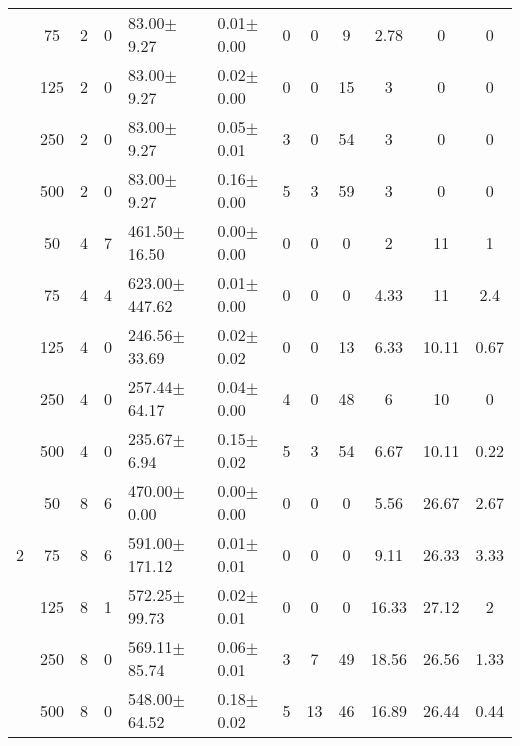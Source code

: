 \documentclass[article]{llncs}
\begin{document}
\begin{table}[h]
\begin{center}
\begin{tabular}{c c c c l l c c c c c c}
 &75      &  2   &    0  &  83.00$\pm$9.27      &        0.01$\pm$0.00  &  0  &          0   &            9   &         2.78    &       0       &  0       \\
 &125     &  2   &    0  &  83.00$\pm$9.27      &        0.02$\pm$0.00  &  0  &          0   &            15  &         3       &       0       &  0       \\
 &250     &  2   &    0  &  83.00$\pm$9.27      &        0.05$\pm$0.01  &  3  &          0   &            54  &         3       &       0       &  0       \\
 &500     &  2   &    0  &  83.00$\pm$9.27      &        0.16$\pm$0.00  &  5  &          3   &            59  &         3       &       0       &  0       \\
 &50      &  4   &    7  &  461.50$\pm$16.50    &        0.00$\pm$0.00  &  0  &          0   &            0   &         2       &       11      &  1       \\
 &75      &  4   &    4  &  623.00$\pm$447.62   &        0.01$\pm$0.00  &  0  &          0   &            0   &         4.33    &       11      &  2.4     \\
 &125     &  4   &    0  &  246.56$\pm$33.69    &        0.02$\pm$0.02  &  0  &          0   &            13  &         6.33    &       10.11   &  0.67    \\
 &250     &  4   &    0  &  257.44$\pm$64.17    &        0.04$\pm$0.00  &  4  &          0   &            48  &         6       &       10      &  0       \\
 &500     &  4   &    0  &  235.67$\pm$6.94     &        0.15$\pm$0.02  &  5  &          3   &            54  &         6.67    &       10.11   &  0.22    \\
 &50      &  8   &    6  &  470.00$\pm$0.00     &        0.00$\pm$0.00  &  0  &          0   &            0   &         5.56    &       26.67   &  2.67    \\
2&75      &  8   &    6  &  591.00$\pm$171.12   &        0.01$\pm$0.01  &  0  &          0   &            0   &         9.11    &       26.33   &  3.33    \\
 &125     &  8   &    1  &  572.25$\pm$99.73    &        0.02$\pm$0.01  &  0  &          0   &            0   &         16.33   &       27.12   &  2       \\
 &250     &  8   &    0  &  569.11$\pm$85.74    &        0.06$\pm$0.01  &  3  &          7   &            49  &         18.56   &       26.56   &  1.33    \\
 &500     &  8   &    0  &  548.00$\pm$64.52    &        0.18$\pm$0.02  &  5  &          13  &            46  &         16.89   &       26.44   &  0.44    \\

\end{tabular}
\end{center}
\end{table}
\end{document}
